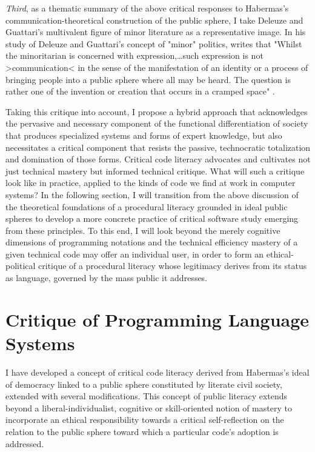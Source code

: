 \emph{Third}, as a thematic summary of the above critical responses to Habermas's communication-theoretical construction of the public sphere, I take Deleuze and Guattari's multivalent figure of minor literature as a representative image. In his study of Deleuze and Guattari's concept of "minor" politics, \citeauthor{Thoburn2003} writes that "Whilst the minoritarian is concerned with expression,…such expression is not >communication< in the sense of the manifestation of an identity or a process of bringing people into a public sphere where all may be heard. The question is rather one of the invention or creation that occurs in a cramped space" \autocite[20]{Thoburn2003}.

Taking this critique into account, I propose a hybrid approach that acknowledges the pervasive and necessary component of the functional differentiation of society that produces specialized systems and forms of expert knowledge, but also necessitates a critical component that resists the passive, technocratic totalization and domination of those forms. Critical code literacy advocates and cultivates not just technical mastery but informed technical critique. What will such a critique look like in practice, applied to the kinds of code we find at work in computer systems? In the following section, I will transition from the above discussion of the theoretical foundations of a procedural literacy grounded in ideal public spheres to develop a more concrete practice of critical software study emerging from these principles. To this end, I will look beyond the merely cognitive dimensions of programming notations and the technical efficiency mastery of a given technical code may offer an individual user, in order to form an ethical-political critique of a procedural literacy whose legitimacy derives from its status as language, governed by the mass public it addresses.

\section{Critique of Programming Language Systems}
I have developed a concept of critical code literacy derived from Habermas's ideal of democracy linked to a public sphere constituted by literate civil society, extended with several modifications. This concept of public literacy extends beyond a liberal-individualist, cognitive or skill-oriented notion of mastery to incorporate an ethical responsibility towards a critical self-reflection on the relation to the public sphere toward which a particular code's adoption is addressed.

